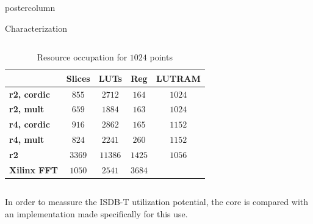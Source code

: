 \documentclass[final]{beamer}
\begin{document}
\begin{frame}{}
\begin{columns}
\begin{column}{.5\textwidth}
\begin{beamercolorbox}[center,wd=\textwidth]{postercolumn}
\begin{minipage}[T]{.99\textwidth}
{\begin{block}{Characterization}
\begin{column}{.32\textwidth}
			\end{column}
			\vrule
			\begin{column}{.57\textwidth}
				\begin{table}[htb!]
				\caption{Resource occupation for $1024$ points}
				\begin{tabular}{l c c c c}
				 & \textbf{Slices} & \textbf{LUTs} & \textbf{Reg} & \textbf{LUTRAM}\\ \hline 
				\textbf{r2, cordic} & $855$ & $2712$ & $164$ & $1024$\\
				\textbf{r2, mult} & $659$ & $1884$ & $163$ & $1024$\\
				\textbf{r4, cordic} & $916$ & $2862$ & $165$ & $1152$\\
				\textbf{r4, mult} & $824$ & $2241$ & $260$ & $1152$\\
				\textbf{r2} & $3369$ & $11386$ & $1425$ & $1056$\\
				\textbf{Xilinx FFT} & $1050$ & $2541$ & $3684$ & $ $\\ \hline
				\end{tabular}
				\label{table:res1024}
				\end{table}
			\end{column}
			
			\begin{column}{.39\textwidth}
			In order to meassure the ISDB-T utilization potential, the core is compared with an implementation made specifically for this use.\\
			

\end{column}
\end{block}}
\end{minipage}
\end{beamercolorbox}
\end{column}
\end{columns}
\end{frame}
\end{document}
